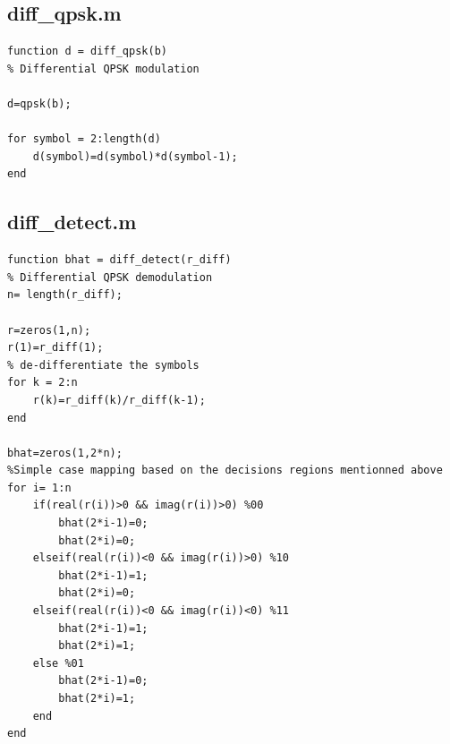 \documentclass[a4paper,12pt]{article}
\begin{document}
\subsection*{diff_qpsk.m}
\begin{verbatim}
function d = diff_qpsk(b)
% Differential QPSK modulation

d=qpsk(b);

for symbol = 2:length(d)  
    d(symbol)=d(symbol)*d(symbol-1);
end
\end{verbatim}

\subsection*{diff_detect.m}
\begin{verbatim}
function bhat = diff_detect(r_diff)
% Differential QPSK demodulation
n= length(r_diff);

r=zeros(1,n);
r(1)=r_diff(1);
% de-differentiate the symbols
for k = 2:n
    r(k)=r_diff(k)/r_diff(k-1);
end
    
bhat=zeros(1,2*n);
%Simple case mapping based on the decisions regions mentionned above
for i= 1:n
    if(real(r(i))>0 && imag(r(i))>0) %00
        bhat(2*i-1)=0;
        bhat(2*i)=0;
    elseif(real(r(i))<0 && imag(r(i))>0) %10
        bhat(2*i-1)=1;
        bhat(2*i)=0;
    elseif(real(r(i))<0 && imag(r(i))<0) %11
        bhat(2*i-1)=1;
        bhat(2*i)=1;
    else %01
        bhat(2*i-1)=0;
        bhat(2*i)=1;
    end
end

\end{verbatim}



\end{document}
